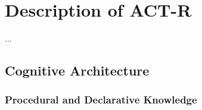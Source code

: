 \chapter{Description of ACT-R}

...

\section{Cognitive Architecture}

\cite{anderson_integrated_2004}

\subsection{Procedural and Declarative Knowledge}